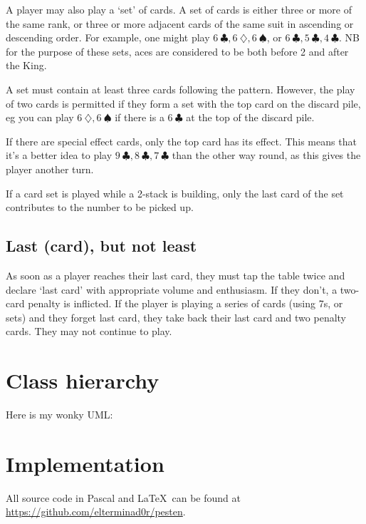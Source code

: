 \documentclass{article}
\begin{document}
    A player may also play a `set' of cards. A set of cards is either three or
    more of the same rank, or three or more adjacent cards of the same suit in
    ascending or descending order. For example, one might play
    $6\ \clubsuit, 6\ \diamondsuit, 6\ \spadesuit$, or
    $6\ \clubsuit, 5\ \clubsuit, 4\ \clubsuit$. NB for the purpose of these
    sets, aces are considered to be both before 2 and after the King.

    A set must contain at least three cards following the pattern. However, the
    play of two cards is permitted if they form a set with the top card on the
    discard pile, eg you can play $6\ \diamondsuit, 6\ \spadesuit$ if there is a 
    $6\ \clubsuit$ at the top of the discard pile.

    If there are special effect cards, only the top card has its effect. This
    means that it's a better idea to play
    $9\ \clubsuit, 8\ \clubsuit, 7\ \clubsuit$
    than the other way round, as this gives the player another turn.

    If a card set is played while a 2-stack is building, only the last card of
    the set contributes to the number to be picked up.

    \subsection{Last (card), but not least} \label{rule:lastcard}

    As soon as a player reaches their last card, they must tap the table twice
    and declare `last card' with appropriate volume and enthusiasm. If they
    don't, a two-card penalty is inflicted. If the player is playing a series
    of cards (using 7s, or sets) and they forget last card, they take back
    their last card and two penalty cards. They may not continue to play.

    \section{Class hierarchy}

    Here is my wonky UML:



    \section{Implementation}

    All source code in Pascal and \LaTeX\ can be found at
    \url{https://github.com/elterminad0r/pesten}.
\end{document}
